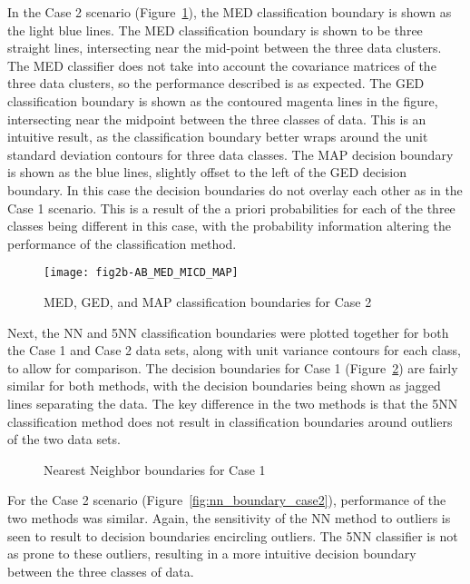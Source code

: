 In the Case 2 scenario (Figure~\ref{fig:med_ged_map_classifier_case2}), the MED classification boundary is shown as the light blue lines. The MED classification boundary is shown to be three straight lines, intersecting near the mid-point between the three data clusters. The MED classifier does not take into account the covariance matrices of the three data clusters, so the performance described is as expected. The GED classification boundary is shown as the contoured magenta lines in the figure, intersecting near the midpoint between the three classes of data. This is an intuitive result, as the classification boundary better wraps around the unit standard deviation contours for three data classes. The MAP decision boundary is shown as the blue lines, slightly offset to the left of the GED decision boundary. In this case the decision boundaries do not overlay each other as in the Case 1 scenario. This is a result of the a priori probabilities for each of the three classes being different in this case, with the probability information altering the performance of the classification method.

\begin{figure}[ht]
\centering
	{
	\texttt{[image: fig2b-AB\_MED\_MICD\_MAP]}
	}
	
	\caption{MED, GED, and MAP classification boundaries for Case 2}
	\label{fig:med_ged_map_classifier_case2}
\end{figure}

Next, the NN and 5NN classification boundaries were plotted together for both the Case 1 and Case 2 data sets, along with unit variance contours for each class, to allow for comparison. The decision boundaries for Case 1 (Figure~\ref{fig:nn_boundary_case1}) are fairly similar for both methods, with the decision boundaries being shown as jagged lines separating the data. The key difference in the two methods is that the 5NN classification method does not result in classification boundaries around outliers of the two data sets.

\begin{figure}[ht]
\centering
	
	\caption{Nearest Neighbor boundaries for Case 1}
	\label{fig:nn_boundary_case1}
\end{figure}

For the Case 2 scenario (Figure~\ref{fig:nn_boundary_case2}), performance of the two methods was similar. Again, the sensitivity of the NN method to outliers is seen to result to decision boundaries encircling outliers. The 5NN classifier is not as prone to these outliers, resulting in a more intuitive decision boundary between the three classes of data.

